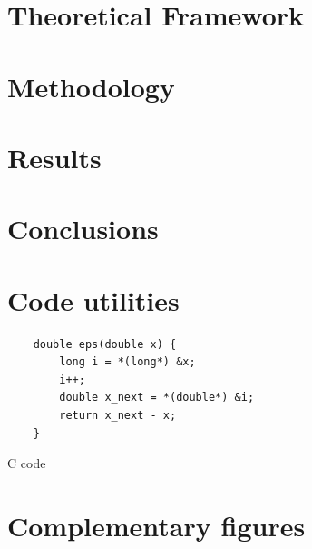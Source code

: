 \documentclass[12pt,letterpaper,oneside]{book}
\begin{document}
	
\chapter{Theoretical Framework}

\chapter{Methodology}

\chapter{Results}

\chapter{Conclusions}


\nocite{*}%




\appendix
\appendixpage
\noappendicestocpagenum
\addappheadtotoc

\chapter{Code utilities}

\begin{listing}[H]
	\begin{verbatim}
	double eps(double x) {
	    long i = *(long*) &x;
	    i++;
	    double x_next = *(double*) &i;
	    return x_next - x;
	}
	\end{verbatim}
	\caption[\texttt{eps} C function]{
		C code
	}
	\label{lst:c-eps}
\end{listing}


\chapter{Complementary figures}
\end{document}
